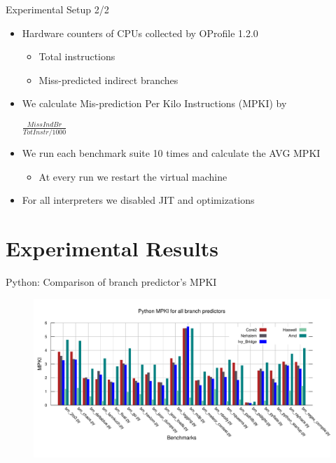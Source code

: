 \documentclass[10pt]{beamer}
\begin{document}
\begin{frame}{Experimental Setup 2/2}
	\begin{itemize}
		\item {Hardware counters of CPUs collected by OProfile 1.2.0}
			\begin{itemize}
				\item {Total instructions}
				\item {Miss-predicted indirect branches}
			\end{itemize}
		\item {We calculate Mis-prediction Per Kilo Instructions (MPKI) by} 
            \begin{center}
                $\frac{MissIndBr}{TotInstr/1000} $%
            \end{center}
		\item {We run each benchmark suite 10 times and calculate the AVG MPKI}
		\begin{itemize}
			\item {At every run we restart the virtual machine}
		\end{itemize}
		\item {For all interpreters we disabled JIT and optimizations}
		
	\end{itemize}
\end{frame}

\section{Experimental Results}
\begin{frame}{Python: Comparison of branch predictor's MPKI}
    \begin{figure}[t]
        \centering
        \includegraphics[width=11.5cm, height=6cm]{figures/python_MPKI.pdf}
    \end{figure}
\end{frame}
\end{document}
